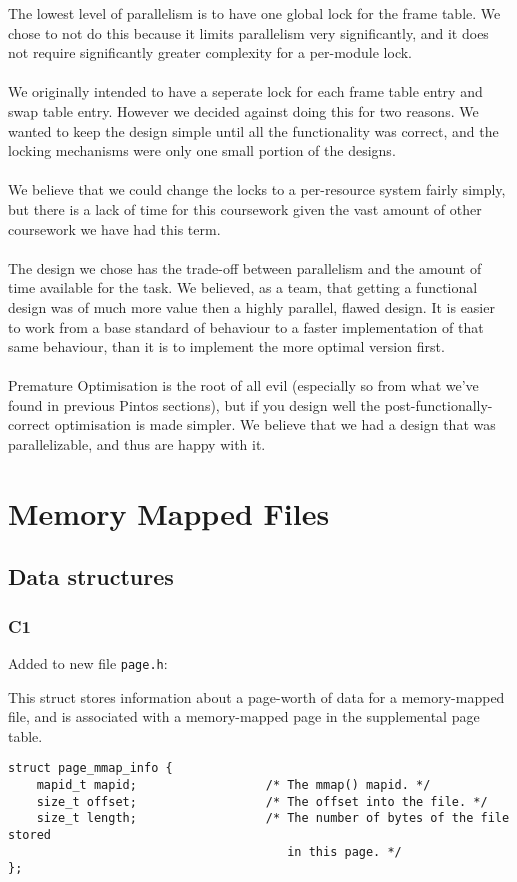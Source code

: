 \documentclass[a4wide, 11pt]{article}
\newcommand{\tx}{\texttt}
\begin{document}
The lowest level of parallelism is to have one global lock for the frame table. We chose to not do this because it limits parallelism very significantly, and it does not require significantly greater complexity for a per-module lock.\\
\\
We originally intended to have a seperate lock for each frame table entry and swap table entry. However we decided against doing this for two reasons. We wanted to keep the design simple until all the functionality was correct, and the locking mechanisms were only one small portion of the designs.\\
\\
We believe that we could change the locks to a per-resource system fairly simply, but there is a lack of time for this coursework given the vast amount of other coursework we have had this term.\\
\\
The design we chose has the trade-off between parallelism and the amount of time available for the task. We believed, as a team, that getting a functional design was of much more value then a highly parallel, flawed design. It is easier to work from a base standard of behaviour to a faster implementation of that same behaviour, than it is to implement the more optimal version first.\\
\\ Premature Optimisation is the root of all evil (especially so from what we've found in previous Pintos sections), but if you design well the post-functionally-correct optimisation is made simpler. We believe that we had a design that was parallelizable, and thus are happy with it.



\section{Memory Mapped Files}
\subsection{Data structures}
\subsubsection{C1}
Added to new file \tx{page.h}:

This struct stores information about a page-worth of data for a memory-mapped file, and is associated with a memory-mapped page in the supplemental page table.
\begin{verbatim}
struct page_mmap_info {
    mapid_t mapid;                  /* The mmap() mapid. */
    size_t offset;                  /* The offset into the file. */
    size_t length;                  /* The number of bytes of the file stored
                                       in this page. */
};
\end{verbatim}
\end{document}
